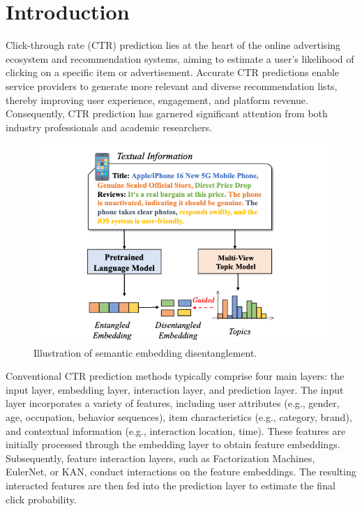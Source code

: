 \chapter{Introduction}

\label{chap:introduction}

Click-through rate (CTR) prediction lies at the heart of the online advertising ecosystem and recommendation systems, aiming to estimate a user’s likelihood of clicking on a specific item or advertisement. Accurate CTR predictions enable service providers to generate more relevant and diverse recommendation lists, thereby improving user experience, engagement, and platform revenue. Consequently, CTR prediction has garnered significant attention from both industry professionals and academic researchers.

\begin{figure}[t]
    \centering
    \includegraphics[width=0.9\linewidth]{Figures/Chapter1/figure1.png}
    \caption{Illustration of semantic embedding disentanglement.}
    \label{fig:disentangle}
\end{figure}

Conventional CTR prediction methods typically comprise four main layers: the input layer, embedding layer, interaction layer, and prediction layer. The input layer incorporates a variety of features, including user attributes (e.g., gender, age, occupation, behavior sequences), item characteristics (e.g., category, brand), and contextual information (e.g., interaction location, time). These features are initially processed through the embedding layer to obtain feature embeddings. Subsequently, feature interaction layers, such as Factorization Machines, EulerNet, or KAN, conduct interactions on the feature embeddings. The resulting interacted features are then fed into the prediction layer to estimate the final click probability.

